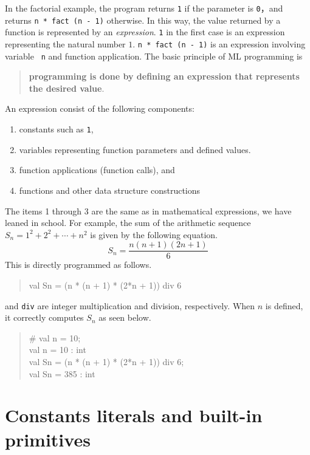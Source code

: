 \documentclass{jbook}
\newcommand{\txt}[2]{#2}
\newenvironment{program}{\begin{quote}\begin{tt}}%
                        {\end{tt}\end{quote}}
\begin{document}
\else%
	In the factorial example, the program returns {\tt 1} 
if the parameter is {\tt 0}，and returns {\tt n * fact (n - 1)}
otherwise.
	In this way, the value returned by a function is represented by
an {\em expression}.
	{\tt 1} in the first case is an expression representing the
natural number $1$.
	{\tt n * fact (n - 1)} is an expression involving variable {\tt
n} and function application.
	The basic principle of ML programming is 
\begin{quote}
{\bf programming is done by defining an expression that represents the desired value}.
\end{quote}

	An expression consist of the following components:
\begin{enumerate}
\item constants such as {\tt 1},
\item variables representing function parameters and defined values.
\item function applications (function calls), and
\item functions and other data structure constructions
\end{enumerate}
	The items 1 through 3 are the same as in mathematical expressions,
we have leaned in school.
	For example, the sum of the arithmetic sequence 
$S_n = 1^2 + 2^2 + \cdots + n^2$
is given by the following equation.
\[
S_n = \frac{n (n + 1) (2n + 1)}{6}
\]
	This is directly programmed as follows.
\begin{program}
val Sn = (n * (n + 1) * (2*n + 1)) div 6
\end{program}
	{\tt *} and {\tt div} are integer multiplication and division,
respectively.
	When $n$ is defined, it correctly computes $S_n$ as seen below.
\begin{program}
\# val n = 10;\\
val n = 10 : int\\
val Sn = (n * (n + 1) * (2*n + 1)) div 6;\\
val Sn = 385 : int
\end{program}

\fi%

\section{
\txt{定数式と組込み関数}
{Constants literals and built-in primitives}
}
\label{sec:tutorialConstants}
\end{document}
